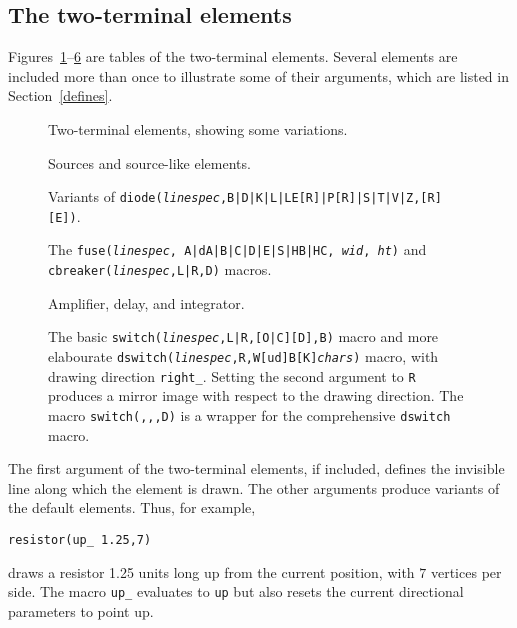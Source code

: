 \subsection{The two-terminal elements}
Figures~\ref{CctTable}--\ref{Switches} are tables of the two-terminal
elements.  Several elements are included more than once to illustrate
some of their arguments, which are listed in Section~\ref{defines}.
\begin{figure}[b!]
   
   \caption{Two-terminal elements, showing some variations.}
   \label{CctTable}
    \end{figure}
\begin{figure}[t!]
   
   \caption{Sources and source-like elements.}
   \label{Sources}
   \end{figure}
\begin{figure}[t!]
   
   \caption{Variants of
     {\tt diode({\sl linespec},B|D|K|L|LE[R]|P[R]|S|T|V|Z,[R][E])}.}
   \label{Diodes}
   \end{figure}
\begin{figure}[t!]
   
   \caption{The
     {\tt fuse({\sl linespec}, A|dA|B|C|D|E|S|HB|HC, {\sl wid}, {\sl ht})}
     and {\tt cbreaker({\sl linespec},L|R,D)} macros.}
   \label{Fuses}
   \end{figure}
\begin{figure}[t!]
   
   \caption{Amplifier, delay, and integrator.}
   \label{AmpTable}
   \end{figure}
\begin{figure}[t!]
   
   \caption{The basic
     {\tt switch({\sl linespec},L|R,[O|C][D],B)}
     macro and more elabourate
     {\tt dswitch({\sl linespec},R,W[ud]B[K]{\sl chars})} macro, with
     drawing direction {\tt right\_}.
     Setting the second argument to {\tt R} produces a mirror
     image with respect to the drawing direction.
     The macro {\tt switch(,,,D)} is a wrapper for the comprehensive
     {\tt dswitch} macro.}
   \label{Switches}
   \end{figure}

The first argument of the two-terminal elements, if included, defines
the invisible line along which the element is drawn.  The other
arguments produce variants of the default elements.  Thus, for example,

{\tt resistor(up\_ 1.25,7)}

\noindent%
draws a resistor 1.25 units long up from the current position, with $7$
vertices per side.
The macro {\tt up\_} evaluates to {\tt up} but also resets the current
directional parameters to point up.

